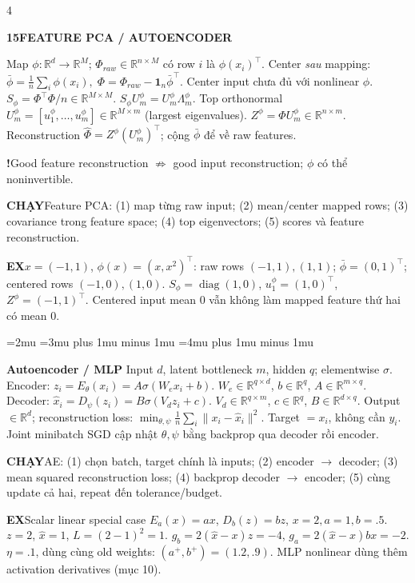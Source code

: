 \documentclass[a4paper]{article}
\newcommand{\bodystyle}{%
  \fontsize{5.4}{5.75}\selectfont\RaggedRight
  \setlength{\lineskip}{.25pt}%
  \thinmuskip=2mu
  \medmuskip=3mu plus 1mu minus 1mu
  \thickmuskip=4mu plus 1mu minus 1mu
  \setlength{\abovedisplayskip}{2pt}\setlength{\belowdisplayskip}{2pt}%
  \setlength{\abovedisplayshortskip}{1pt}\setlength{\belowdisplayshortskip}{1pt}}
\newcommand{\topic}[2]{\par\addvspace{.8pt}%
  \begingroup\setlength{\fboxsep}{0.5pt}%
  \noindent\colorbox{structure}{\parbox{\dimexpr\linewidth-2\fboxsep\relax}{%
    \color{white}\fontsize{6.5}{7.1}\selectfont\bfseries #1\enspace #2}}%
  \endgroup\par\nobreak\vspace{.3pt}\nobreak}
\newcommand{\run}[1]{\key{CHẠY}#1}
\newcommand{\key}[1]{\par\textcolor{structure}{\textbf{#1}}\enspace}
\newcommand{\note}[4]{\par\begingroup\setlength{\fboxsep}{0.15pt}%
  \noindent\colorbox{#1}{\parbox{\dimexpr\linewidth-2\fboxsep\relax}{%
    \RaggedRight\textcolor{#2}{\textbf{#3}}\enspace #4}}%
  \endgroup\par}
\newcommand{\trap}[1]{\note{warningbg}{warning}{!}{#1}}
\newcommand{\ex}[1]{\note{examplebg}{example}{EX}{#1}}
\newcommand{\R}{\mathbb{R}}
\newcommand{\norm}[1]{\lVert#1\rVert}
\newcommand{\ind}{\mathbf1}
\newcommand{\diag}{\operatorname{diag}}
\begin{document}
\begin{multicols*}{4}
\topic{15}{FEATURE PCA / AUTOENCODER}
Map $\phi:\R^d\to\R^M$; $\Phi_{raw}\in\R^{n\times M}$ có row $i$ là $\phi(x_i)^\top$. Center \emph{sau} mapping:
$\bar\phi=\tfrac1n\sum_i\phi(x_i),\; \Phi=\Phi_{raw}-\ind_n\bar\phi^\top.$
Center input chưa đủ với nonlinear $\phi$.
$S_\phi=\Phi^\top\Phi/n\in\R^{M\times M}.$
$S_\phi U_m^\phi=U_m^\phi\Lambda_m^\phi.$
Top orthonormal $U_m^\phi=[u_1^\phi,\ldots,u_m^\phi]\in\R^{M\times m}$ (largest eigenvalues).
$Z^\phi=\Phi U_m^\phi\in\R^{n\times m}.$
Reconstruction $\hat\Phi=Z^\phi(U_m^\phi)^\top$; cộng $\bar\phi$ để về raw features.
\trap{Good feature reconstruction $\not\Rightarrow$ good input reconstruction; $\phi$ có thể noninvertible.}
\run{Feature PCA: (1) map từng raw input; (2) mean/center mapped rows; (3) covariance trong feature space; (4) top eigenvectors; (5) scores và feature reconstruction.}
\ex{$x=(-1,1)$, $\phi(x)=(x,x^2)^\top$: raw rows $(-1,1),(1,1)$; $\bar\phi=(0,1)^\top$; centered rows $(-1,0),(1,0)$. $S_\phi=\diag(1,0)$, $u_1^\phi=(1,0)^\top$, $Z^\phi=(-1,1)^\top$. Centered input mean $0$ vẫn không làm mapped feature thứ hai có mean $0$.}
\par\noindent\begin{minipage}[t]{\linewidth}\bodystyle
\key{Autoencoder / MLP}
Input $d$, latent bottleneck $m$, hidden $q$; elementwise $\sigma$. Encoder:
$z_i=E_\theta(x_i)=A\sigma(W_e x_i+b).$
$W_e\in\R^{q\times d}$, $b\in\R^q$, $A\in\R^{m\times q}$. Decoder:
$\hat x_i=D_\psi(z_i)=B\sigma(V_d z_i+c).$
$V_d\in\R^{q\times m}$, $c\in\R^q$, $B\in\R^{d\times q}$. Output $\in\R^d$; reconstruction loss:
$\min_{\theta,\psi}\frac1n\sum_i\norm{x_i-\hat x_i}^2.$
Target $=x_i$, không cần $y_i$. Joint minibatch SGD cập nhật $\theta,\psi$ bằng backprop qua decoder rồi encoder.
\run{AE: (1) chọn batch, target chính là inputs; (2) encoder $\to$ decoder; (3) mean squared reconstruction loss; (4) backprop decoder $\to$ encoder; (5) cùng update cả hai, repeat đến tolerance/budget.}
\ex{Scalar linear special case $E_a(x)=ax$, $D_b(z)=bz$, $x=2,a=1,b=.5$. $z=2$, $\hat x=1$, $L=(2-1)^2=1$. $g_b=2(\hat x-x)z=-4$, $g_a=2(\hat x-x)bx=-2$. $\eta=.1$, dùng cùng old weights: $(a^+,b^+)=(1.2,.9)$. MLP nonlinear dùng thêm activation derivatives (mục 10).}
\end{minipage}\par



\end{multicols*}
\end{document}
